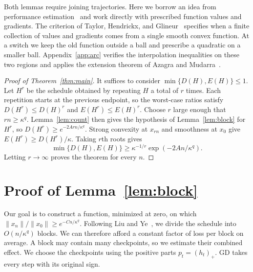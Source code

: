 \documentclass[11pt]{article}
\theoremstyle{definition}
\begin{document}
Both lemmas require joining trajectories. Here we borrow an idea from performance estimation~\cite{DT} and work directly with prescribed function values and gradients. The criterion of Taylor, Hendrickx, and Glineur~\cite[Corollary~1]{THG} specifies when a finite collection of values and gradients comes from a single smooth convex function. At a switch we keep the old function outside a ball and prescribe a quadratic on a smaller ball. Appendix~\ref{app:arc} verifies the interpolation inequalities on these two regions and applies the extension theorem of Azagra and Mudarra~\cite[Theorem~1.3]{AM}.

\begin{proof}[Proof of Theorem~\ref{thm:main}]
It suffices to consider $\min\{D(H),E(H)\}\le1$. Let $H^r$ be the schedule obtained by repeating $H$ a total of $r$ times. Each repetition starts at the previous endpoint, so the worst-case ratios satisfy $D(H^r)\le D(H)^r$ and $E(H^r)\le E(H)^r$. Choose $r$ large enough that $rn\ge\kappa^q$. Lemma~\ref{lem:count} then gives the hypothesis of Lemma~\ref{lem:block} for $H^r$, so $D(H^r)\ge e^{-2Arn/\kappa^q}$. Strong convexity at $x_{rn}$ and smoothness at $x_0$ give $E(H^r)\ge D(H^r)/\kappa$. Taking $r$th roots gives
\[
 \min\{D(H),E(H)\}\ge \kappa^{-1/r}\exp(-2An/\kappa^q).
\]
Letting $r\to\infty$ proves the theorem for every $n$.
\end{proof}

\section{Proof of Lemma~\ref{lem:block}}\label{sec:proof-block}

Our goal is to construct a function, minimized at zero, on which
\(\|x_n\|/\|x_0\|\ge e^{-Cn/\kappa^q}\).
Following Liu and Ye~\cite[Sections~4--5]{LY}, we divide the schedule
into \(O(n/\kappa^q)\) blocks. We can therefore afford a constant factor
of loss per block on average. A block may contain many checkpoints, so
we estimate their combined effect. We choose the checkpoints using the
positive parts \(p_t=(h_t)_+\). GD takes every step with its original sign.
\end{document}
